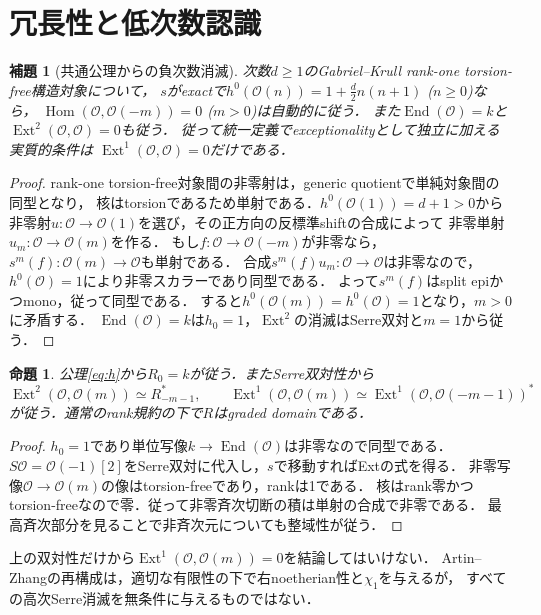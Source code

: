 \documentclass[11pt,a4paper]{ltjsarticle}
\newtheorem{proposition}[theorem]{命題}
\newtheorem{lemma}[theorem]{補題}
\theoremstyle{definition}\newtheorem{definition}[theorem]{定義}
\newcommand{\OO}{\mathcal O}\newcommand{\cA}{\mathcal A}
\newcommand{\End}{\operatorname{End}}\newcommand{\Hom}{\operatorname{Hom}}\newcommand{\Ext}{\operatorname{Ext}}
\begin{document}
\section{冗長性と低次数認識}
\begin{lemma}[共通公理からの負次数消滅]
\label{lem:negative-auto}
次数$d\ge1$のGabriel--Krull rank-one torsion-free構造対象について，
$s$がexactで$h^0(\OO(n))=1+\frac d2n(n+1)$ ($n\ge0$)なら，
$\Hom(\OO,\OO(-m))=0$ ($m>0$)は自動的に従う．
また$\End(\OO)=k$と$\Ext^2(\OO,\OO)=0$も従う．
従って統一定義でexceptionalityとして独立に加える実質的条件は
$\Ext^1(\OO,\OO)=0$だけである．
\end{lemma}
\begin{proof}
rank-one torsion-free対象間の非零射は，generic quotientで単純対象間の同型となり，
核はtorsionであるため単射である．$h^0(\OO(1))=d+1>0$から
非零射$u:\OO\to\OO(1)$を選び，その正方向の反標準shiftの合成によって
非零単射$u_m:\OO\to\OO(m)$を作る．
もし$f:\OO\to\OO(-m)$が非零なら，$s^m(f):\OO(m)\to\OO$も単射である．
合成$s^m(f)u_m:\OO\to\OO$は非零なので，
$h^0(\OO)=1$により非零スカラーであり同型である．
よって$s^m(f)$はsplit epiかつmono，従って同型である．
すると$h^0(\OO(m))=h^0(\OO)=1$となり，$m>0$に矛盾する．
$\End(\OO)=k$は$h_0=1$，$\Ext^2$の消滅はSerre双対と$m=1$から従う．
\end{proof}

\begin{proposition}\label{prop:automatic}
公理\eqref{eq:h}から$R_0=k$が従う．またSerre双対性から
\[
 \Ext^2(\OO,\OO(m))\simeq R_{-m-1}^*,\qquad
 \Ext^1(\OO,\OO(m))\simeq\Ext^1(\OO,\OO(-m-1))^*
\]
が従う．通常のrank規約の下で$R$はgraded domainである．
\end{proposition}
\begin{proof}
$h_0=1$であり単位写像$k\to\End(\OO)$は非零なので同型である．
$S\OO=\OO(-1)[2]$をSerre双対に代入し，$s$で移動すればExtの式を得る．
非零写像$\OO\to\OO(m)$の像はtorsion-freeであり，rankは1である．
核はrank零かつtorsion-freeなので零．従って非零斉次切断の積は単射の合成で非零である．
最高斉次部分を見ることで非斉次元についても整域性が従う．
\end{proof}
上の双対性だけから$\Ext^1(\OO,\OO(m))=0$を結論してはいけない．
Artin--Zhangの再構成は，適切な有限性の下で右noetherian性と$\chi_1$を与えるが，
すべての高次Serre消滅を無条件に与えるものではない\cite{AZ}．
\end{document}

